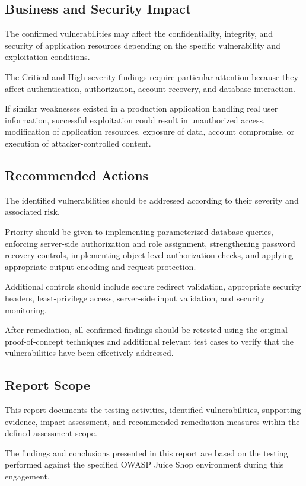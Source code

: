 \subsection*{Business and Security Impact}

The confirmed vulnerabilities may affect the confidentiality,
integrity, and security of application resources depending on the
specific vulnerability and exploitation conditions.

The Critical and High severity findings require particular attention
because they affect authentication, authorization, account recovery,
and database interaction.

If similar weaknesses existed in a production application handling
real user information, successful exploitation could result in
unauthorized access, modification of application resources, exposure
of data, account compromise, or execution of attacker-controlled
content.

\subsection*{Recommended Actions}

The identified vulnerabilities should be addressed according to their
severity and associated risk.

Priority should be given to implementing parameterized database
queries, enforcing server-side authorization and role assignment,
strengthening password recovery controls, implementing object-level
authorization checks, and applying appropriate output encoding and
request protection.

Additional controls should include secure redirect validation,
appropriate security headers, least-privilege access, server-side
input validation, and security monitoring.

After remediation, all confirmed findings should be retested using
the original proof-of-concept techniques and additional relevant test
cases to verify that the vulnerabilities have been effectively
addressed.

\subsection*{Report Scope}

This report documents the testing activities, identified
vulnerabilities, supporting evidence, impact assessment, and
recommended remediation measures within the defined assessment scope.

The findings and conclusions presented in this report are based on
the testing performed against the specified OWASP Juice Shop
environment during this engagement.